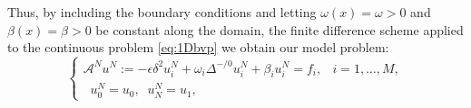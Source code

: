 Thus, by including the boundary conditions and letting
$\omega(x)=\omega>0$ and $\beta(x) = \beta>0$ be constant along the domain,
the finite difference scheme applied to the continuous problem \eqref{eq:1Dbvp} we obtain our model problem:
%
\begin{equation}\label{eq:1DbvpD}
\begin{cases}
\mathscr{A}^{N}u^N:=-\epsilon \delta^2 u^N_i + \omega_i \Delta^{-/0}u^N_i +\beta_i u^N_i = f_i, & i=1,\ldots,M,\\
\;\;u^N_0=u_0,\;\;u^N_N=u_1, &
\end{cases}
\end{equation}

